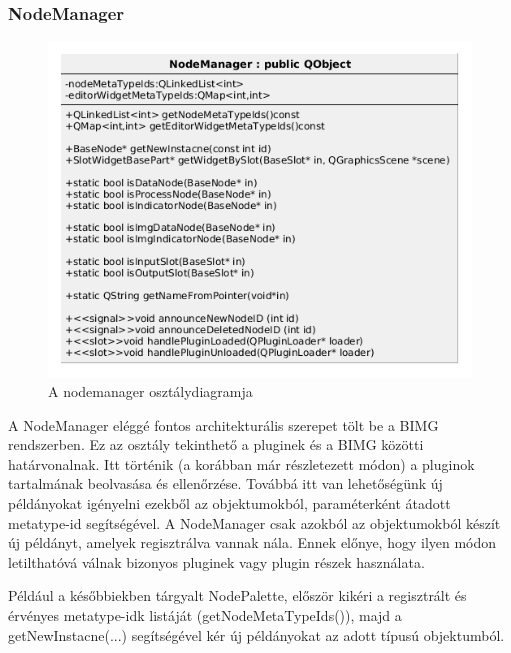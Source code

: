 \documentclass[a4paper,12pt,oneside]{report}
\begin{document}
\subsubsection{NodeManager}
\begin{center}
\begin{figure}[h]
  \includegraphics[width=1\textwidth]{nodeman_diag.png}
  \caption{A nodemanager osztálydiagramja }

  \label{fig:bimg_node_man}
\end{figure}
\end{center}
A NodeManager eléggé fontos architekturális szerepet tölt be a BIMG rendszerben. Ez az osztály tekinthető a pluginek és a BIMG közötti határvonalnak. Itt történik (a korábban már részletezett módon) a pluginok tartalmának beolvasása és ellenőrzése. Továbbá itt van lehetőségünk új példányokat igényelni ezekből az objektumokból, paraméterként átadott metatype-id segítségével. A NodeManager csak azokból az objektumokból készít új példányt, amelyek regisztrálva vannak nála. Ennek előnye, hogy ilyen módon letilthatóvá válnak bizonyos pluginek vagy plugin részek használata.

Például a későbbiekben tárgyalt NodePalette, először kikéri a regisztrált és érvényes metatype-idk listáját (getNodeMetaTypeIds()), majd a getNewInstacne(...) segítségével kér új példányokat az adott típusú objektumból.
\end{document}

